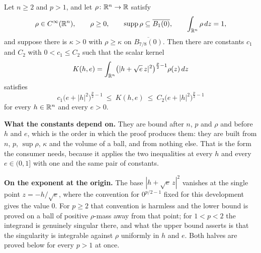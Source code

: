 \begin{helper}
Let $n\ge2$ and $p>1$, and let $\rho\colon\mathbb{R}^n\to\mathbb{R}$ satisfy
\[
\rho\in C^\infty(\mathbb{R}^n),
\qquad
\rho\ge0,
\qquad
\operatorname{supp}\rho\subseteq\overline{B_1(0)},
\qquad
\int_{\mathbb{R}^n}\rho\,dz=1 ,
\]
and suppose there is $\kappa>0$ with $\rho\ge\kappa$ on $\overline{B_{7/8}(0)}$.
Then there are constants $c_1$ and $C_2$ with $0<c_1\le C_2$ such that the
scalar kernel
\[
K(h,e)=\int_{\mathbb{R}^n}\bigl(|h+\sqrt e\,z|^2\bigr)^{\frac p2-1}\rho(z)\,dz
\]
satisfies
\[
c_1\bigl(e+|h|^2\bigr)^{\frac p2-1}\ \le\ K(h,e)\ \le\ C_2\bigl(e+|h|^2\bigr)^{\frac p2-1}
\]
for every $h\in\mathbb{R}^n$ and every $e>0$.

\textbf{What the constants depend on.}  They are bound after $n$, $p$ and
$\rho$ and before $h$ and $e$, which is the order in which the proof produces
them: they are built from $n$, $p$, $\sup\rho$, $\kappa$ and the volume of a
ball, and from nothing else.  That is the form the consumer needs, because it
applies the two inequalities at every $h$ and every $e\in(0,1]$ with one and the
same pair of constants.

\textbf{On the exponent at the origin.}  The base $|h+\sqrt e\,z|^2$ vanishes at
the single point $z=-h/\sqrt e$, where the convention for $0^{p/2-1}$ fixed for
this development gives the value $0$.  For $p\ge2$ that convention is harmless
and the lower bound is proved on a ball of positive $\rho$-mass away from that
point; for $1<p<2$ the integrand is genuinely singular there, and what the upper
bound asserts is that the singularity is integrable against $\rho$ uniformly in
$h$ and $e$.  Both halves are proved below for every $p>1$ at once.
\end{helper}
